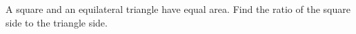 A square and an equilateral triangle have equal area. Find the ratio of the square side to the triangle side.
